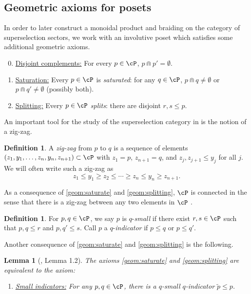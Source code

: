 \documentclass[11pt,reqno]{amsart}
\numberwithin{equation}{section}
\theoremstyle{plain}
\newtheorem{lemma}[equation]{Lemma}
\theoremstyle{definition}
\newtheorem{definition}[equation]{Definition}
\begin{document}
\subsection{Geometric axioms for posets}
\label{sec:GeometricAxioms}
In order to later construct a monoidal product and braiding on the category of superselection sectors, we work with an involutive poset which satisfies some additional geometric axioms.
\begin{enumerate}[label=\textup{(GA\arabic*)}, series=geom]
\setcounter{enumi}{-1}
\item 
\label{geom:SelfDisjoint}
\underline{Disjoint complements:}
For every $p\in\cP$, $p\Cap p'=\emptyset$.

\item 
\label{geom:saturate}
\underline{Saturation:}
Every $p\in\cP$ is \emph{saturated}: for any $q\in\cP$, $p\Cap q\neq \emptyset$ or $p\Cap q'\neq \emptyset$ (possibly both).

\item 
\label{geom:splitting}
\underline{Splitting:}
Every $p \in \cP$ \emph{splits}: there are disjoint $r,s \leq p$.
\end{enumerate}
An important tool for the study of the superselection category in \cite{MR4927814} is the notion of a zig-zag. 
\begin{definition}
    A \emph{zig-zag} from $p$ to $q$ is a sequence of elements $(z_1,y_1,\dots , z_n, y_n, z_{n+1}) \subset \cP$ with $z_1=p$, $z_{n+1}=q$, and $z_j, z_{j+1}\leq y_j$ for all $j$. We will often write such a zig-zag as
    $$z_1\leq y_1 \geq z_2 \leq \cdots \geq z_n \leq y_n \geq z_{n+1}.$$
\end{definition}
\noindent As a consequence of \ref{geom:saturate} and \ref{geom:splitting}, $\cP$ is connected in the sense that there is a zig-zag between any two elements in $\cP$ \cite[Lemma~1.1]{MR4927814}.

\begin{definition}
    For $p, q \in \cP$, we say $p$ is $q$-\textit{small} if there exist $r, s \in \cP$ such that $p, q \leq r$ and $p, q' \leq s$. Call $p$ a $q$-\textit{indicator} if $p\leq q$ or $p\leq q'$.
\end{definition}

\noindent Another consequence of \ref{geom:saturate} and \ref{geom:splitting} is the following.
\begin{lemma} [\cite{MR4927814}, Lemma 1.2]
    The axioms \ref{geom:saturate} and \ref{geom:splitting} are equivalent to the axiom:
\begin{enumerate}[label=\textup{(GA1.5)}, series=geomconsequence]
\item
\label{geom:qSmallqIndicator}
\textup{\underline{Small indicators:}
For any $p,q\in\cP$, there is a $q$-small $q$-indicator $\widetilde{p}\leq p$.
}
\end{enumerate}
\end{lemma}
\end{document}
